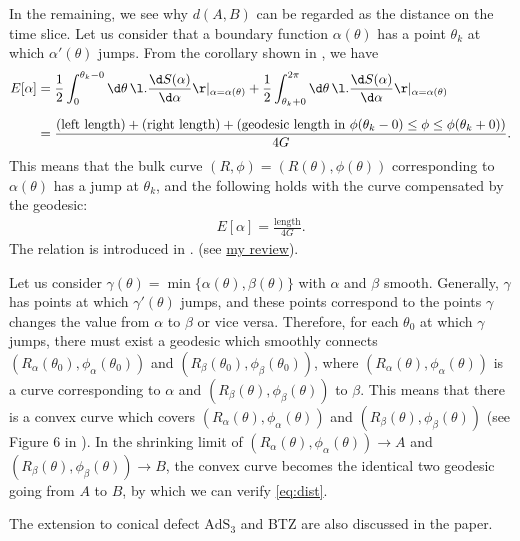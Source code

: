 \documentclass[12pt]{article}
\begin{document}
In the remaining, we see why $d(A,B)$ can be regarded as the distance on the time slice.
Let us consider that a boundary function $\alpha(\theta)$ has a point $\theta_k$ at which $\alpha'(\theta)$ jumps.
From the corollary shown in \cite{Balasubramanian:2013lsa}, we have
\begin{align}
	E[\alpha] &= \frac{1}{2}\int_{0}^{\theta_k-0}\d\theta\,\l.\frac{\d S(\alpha)}{\d \alpha}\r|_{\alpha = \alpha(\theta)} + \frac{1}{2}\int_{\theta_k+0}^{2\pi}\d\theta\,\l.\frac{\d S(\alpha)}{\d \alpha}\r|_{\alpha = \alpha(\theta)}\nonumber\\[2mm]
	&= \frac{(\mbox{left length}) + (\mbox{right length}) + (\mbox{geodesic length in } \phi(\theta_k-0)\leq \phi\leq \phi(\theta_k+0))}{4G}.
\end{align}
This means that the bulk curve $(R,\phi) = (R(\theta),\phi(\theta))$ corresponding to $\alpha(\theta)$ has a jump at $\theta_k$,
and the following holds with the curve compensated by the geodesic:
\begin{align}
	E[\alpha] = \frac{\mbox{length}}{4G}.
\end{align}
The relation is introduced in \cite{Balasubramanian:2013lsa}.
(see \href{https://albertmcc.github.io/web/reviews/Hole_ographic_spacetime.pdf}{\color{blue}my review}).

Let us consider $\gamma(\theta) = \min\{\alpha(\theta),\beta(\theta)\}$ with $\alpha$ and $\beta$ smooth.
Generally, $\gamma$ has points at which $\gamma'(\theta)$ jumps, and these points correspond to the points $\gamma$
 changes the value from $\alpha$ to $\beta$ or vice versa.
Therefore, for each $\theta_0$ at which $\gamma$ jumps, there must exist a geodesic which smoothly connects 
$(R_\alpha(\theta_0),\phi_\alpha(\theta_0))$ and $(R_\beta(\theta_0),\phi_\beta(\theta_0))$, where 
$(R_\alpha(\theta),\phi_\alpha(\theta))$ is a curve corresponding to $\alpha$ and $(R_\beta(\theta),\phi_\beta(\theta))$ to 
$\beta$.
This means that there is a convex curve which covers $(R_\alpha(\theta),\phi_\alpha(\theta))$ and 
$(R_\beta(\theta),\phi_\beta(\theta))$ (see Figure 6 in \cite{Czech:2014ppa}).
In the shrinking limit of $(R_\alpha(\theta),\phi_\alpha(\theta))\to A$ and $(R_\beta(\theta),\phi_\beta(\theta))\to B$, 
the convex curve becomes the identical two geodesic going from $A$ to $B$, by which we can verify \eqref{eq:dist}.

The extension to conical defect $\mathrm{AdS}_3$ and BTZ are also discussed in the paper.












 

\end{document}
